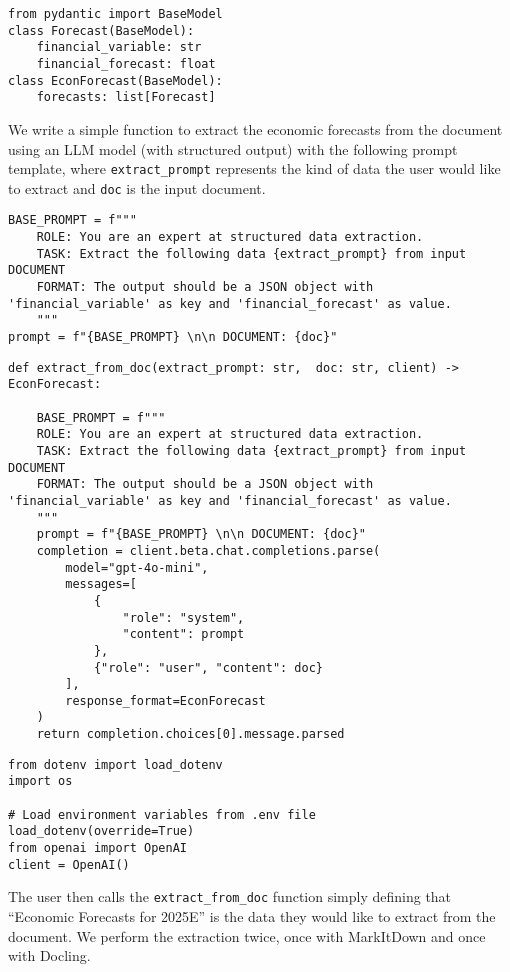 \begin{verbatim}
from pydantic import BaseModel
class Forecast(BaseModel):
    financial_variable: str
    financial_forecast: float
class EconForecast(BaseModel):
    forecasts: list[Forecast]
\end{verbatim}

We write a simple function to extract the economic forecasts from the document using an LLM model (with structured output) with the following prompt template, where \texttt{extract\_prompt} represents the kind of data the user would like to extract and \texttt{doc} is the input document.

\begin{verbatim}
BASE_PROMPT = f"""
    ROLE: You are an expert at structured data extraction. 
    TASK: Extract the following data {extract_prompt} from input DOCUMENT
    FORMAT: The output should be a JSON object with 'financial_variable' as key and 'financial_forecast' as value.
    """
prompt = f"{BASE_PROMPT} \n\n DOCUMENT: {doc}"
\end{verbatim}

\begin{verbatim}
def extract_from_doc(extract_prompt: str,  doc: str, client) -> EconForecast:

    BASE_PROMPT = f"""
    ROLE: You are an expert at structured data extraction. 
    TASK: Extract the following data {extract_prompt} from input DOCUMENT
    FORMAT: The output should be a JSON object with 'financial_variable' as key and 'financial_forecast' as value.
    """
    prompt = f"{BASE_PROMPT} \n\n DOCUMENT: {doc}"
    completion = client.beta.chat.completions.parse(
        model="gpt-4o-mini",
        messages=[
            {
                "role": "system",
                "content": prompt
            },
            {"role": "user", "content": doc}
        ],
        response_format=EconForecast
    )
    return completion.choices[0].message.parsed
\end{verbatim}
\begin{verbatim}
from dotenv import load_dotenv
import os

# Load environment variables from .env file
load_dotenv(override=True)
from openai import OpenAI
client = OpenAI()
\end{verbatim}

The user then calls the \texttt{extract\_from\_doc} function simply defining that ``Economic Forecasts for 2025E'' is the data they would like to extract from the document. We perform the extraction twice, once with MarkItDown and once with Docling.

